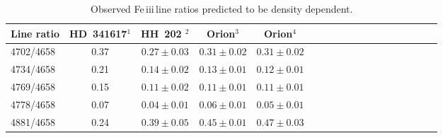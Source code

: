 \documentclass{emulateapj}
\newcommand\fe{Fe\,{\sc iii}\,}
\begin{document}



\begin{table*}
{\footnotesize
\centering
\begin{minipage}{10cm}
\centering
\caption{ Observed \fe line ratios predicted to be density dependent.} \label{Table:obs1}
  \begin{tabular}{lccccccccccccccccc} \hline\hline 
	

Line ratio 	& { HD~341617}$^1$ 	&{HH~202 }$^2$ 				&{ Orion}$^3$			&Orion$^4$\hspace{0.5cm}			\\ \hline 
                                                                                                                                                         
4702/4658			&0.37			&$0.27 \pm 0.03$			&$0.31 \pm 0.02$		&$0.31 \pm 0.02$	        	\\
                                                                                                                                                         
4734/4658			&0.21			&$0.14 \pm 0.02$			&$0.13 \pm 0.01$		&$0.12 \pm 0.01$	        	\\
                                                                                                                                                         
4769/4658			&0.15			&$0.11 \pm 0.02$			&$0.11 \pm 0.01$		&$0.11 \pm 0.01$	        	\\
                                                                                                                                                         
4778/4658			&0.07			&$0.04 \pm 0.01$			&$0.06 \pm 0.01$		&$0.05 \pm 0.01$	        	\\
                                                                                                                                                         
4881/4658			&0.24			&$0.39 \pm 0.05$			&$0.45 \pm 0.01$		&$0.47 \pm 0.03$	        	\\
                                                                                                                                                         

\end{tabular}
\end{minipage}}
\end{table*}
\end{document}
